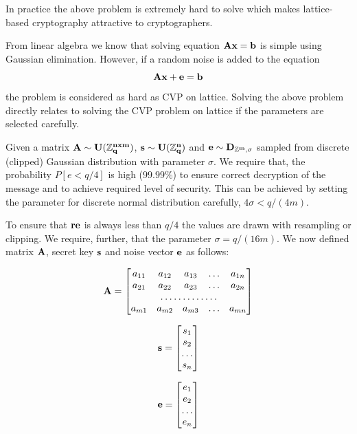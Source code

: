 In practice the above problem is extremely hard to solve which makes lattice-based cryptography 
attractive to cryptographers.

From linear algebra we know that solving equation $\bf{Ax}=\bf{b}$ is simple using
Gaussian elimination. However, if a random noise is added to the equation $$\bf{Ax} + \bf{e} = \bf{b}$$ the 
problem is considered as hard as CVP on lattice. Solving the above problem directly relates to 
solving the CVP problem on lattice if the parameters are selected carefully.

Given a matrix $\bf{A} \sim U(\mathbb{Z}^{nxm}_q)$, $\bf{s} \sim U(\mathbb{Z}^{n}_q)$ and $\bf{e} \sim D_{\mathbb{Z}^{m}, \sigma}$ 
sampled from discrete (clipped) Gaussian distribution with parameter $\sigma$. We require that, the probability
$P[e < q/4]$ is high (\ie $99.99\%$) to ensure correct decryption of the message and to achieve required 
level of security. This can be achieved by setting the parameter for discrete normal distribution carefully, \ie $4\sigma < q/(4m)$.

To ensure that $\bf{re}$ is always less than $q/4$ the values are drawn with resampling
or clipping. We require, further, that the parameter $\sigma = q/(16m)$. We now defined 
matrix ${\bf A}$, secret key ${\bf s}$ and noise vector ${\bf e}$ as follows:

\begin{equation}
    {\bf A}=\begin{bmatrix}
        a_{11}       & a_{12} & a_{13} & \dots & a_{1n} \\
        a_{21}       & a_{22} & a_{23} & \dots & a_{2n} \\
        \hdotsfor{5} \\
        a_{m1}       & a_{m2} & a_{m3} & \dots & a_{mn}
    \end{bmatrix}
\end{equation}

\begin{equation}
    {\bf s}=\begin{bmatrix}
        s_{1} \\
        s_{2} \\
        \dots \\
        s_{n} 
    \end{bmatrix}
\end{equation}

\begin{equation}
    {\bf e}=\begin{bmatrix}
        e_{1} \\
        e_{2} \\
        \dots \\
        e_{n} 
    \end{bmatrix}
\end{equation}

